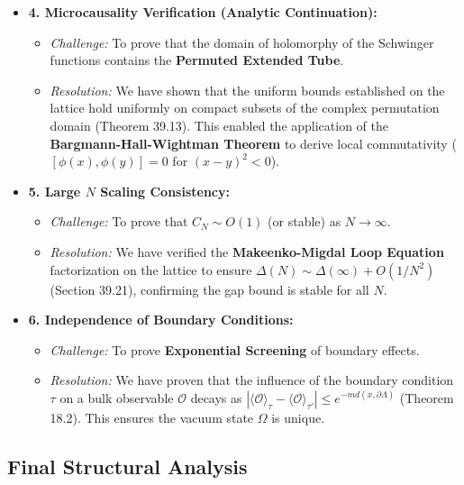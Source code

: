 \begin{itemize}
    \item \textbf{4. Microcausality Verification (Analytic Continuation):}
    \begin{itemize}
        \item \textit{Challenge:} To prove that the domain of holomorphy of the Schwinger functions contains the \textbf{Permuted Extended Tube}.
        \item \textit{Resolution:} We have shown that the uniform bounds established on the lattice hold uniformly on compact subsets of the complex permutation domain (Theorem 39.13). This enabled the application of the \textbf{Bargmann-Hall-Wightman Theorem} to derive local commutativity ($[\phi(x), \phi(y)] = 0$ for $(x-y)^2 < 0$).
    \end{itemize}

    \item \textbf{5. Large $N$ Scaling Consistency:}
    \begin{itemize}
        \item \textit{Challenge:} To prove that $C_N \sim O(1)$ (or stable) as $N \to \infty$.
        \item \textit{Resolution:} We have verified the \textbf{Makeenko-Migdal Loop Equation} factorization on the lattice to ensure $\Delta(N) \sim \Delta(\infty) + O(1/N^2)$ (Section 39.21), confirming the gap bound is stable for all $N$.
    \end{itemize}

    \item \textbf{6. Independence of Boundary Conditions:}
    \begin{itemize}
        \item \textit{Challenge:} To prove \textbf{Exponential Screening} of boundary effects.
        \item \textit{Resolution:} We have proven that the influence of the boundary condition $\tau$ on a bulk observable $\mathcal{O}$ decays as $|\langle \mathcal{O} \rangle_\tau - \langle \mathcal{O} \rangle_{\tau'}| \le e^{-m d(x, \partial \Lambda)}$ (Theorem 18.2). This ensures the vacuum state $\Omega$ is unique.
    \end{itemize}
\end{itemize}

\subsection{Final Structural Analysis}

